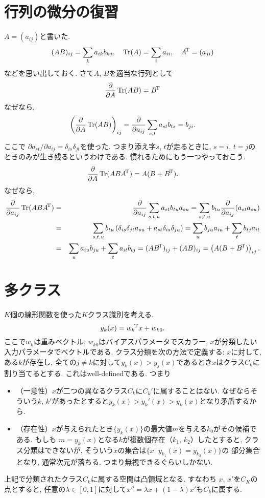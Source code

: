 \section{行列の微分の復習}
$A=(a_{ij})$と書いた.
$$
(AB)_{ij}=\sum_k a_{ik} b_{kj}, \quad \mathop{\mathrm{Tr}}\nolimits(A)=\sum_i a_{ii}, \quad {A}^{\!\mathrm{T}}=(a_{ji})
$$
などを思い出しておく.
さて$A$, $B$を適当な行列として
$$
\frac{\partial}{\partial A}\mathop{\mathrm{Tr}}\nolimits(AB)={B}^{\!\mathrm{T}}
$$
なぜなら,
$$
\left(\frac{\partial}{\partial A}\mathop{\mathrm{Tr}}\nolimits(AB)\right)_{ij}=\frac{\partial}{\partial a_{ij}}\sum_{s,t} a_{st} b_{ts} = b_{ji}.
$$
ここで
$\partial a_{st}/ \partial a_{ij}= \delta_{is} \delta_{jt}$を使った. つまり添え字$s$, $t$が走るときに, $s=i$, $t=j$のときのみが生き残るというわけである.
慣れるためにもう一つやっておこう.
$$
\frac{\partial}{\partial A}\mathop{\mathrm{Tr}}\nolimits(AB{A}^{\!\mathrm{T}})=A(B+{B}^{\!\mathrm{T}}).
$$
なぜなら,
\begin{eqnarray*}
\frac{\partial}{\partial a_{ij}} \mathop{\mathrm{Tr}}\nolimits(AB{A}^{\!\mathrm{T}})
 &=& \frac{\partial}{\partial a_{ij}} \sum_{s,t,u} a_{st} b_{tu} a_{su}
 = \sum_{s,t,u} b_{tu}  \frac{\partial}{\partial a_{ij}} (a_{st} a_{su})\\
 &=& \sum_{s,t,u} b_{tu} \left(\delta_{is} \delta_{jt} a_{su} + a_{st} \delta_{is} \delta_{ju}\right)
 = \sum_{u} b_{ju} a_{iu} + \sum_{t} b_{tj} a_{it}\\
 &=& \sum_{u} a_{iu} b_{ju} + \sum_{t} a_{it} b_{tj}
 = (A{B}^{\!\mathrm{T}})_{ij} + (AB)_{ij}
 = \left(A(B + {B}^{\!\mathrm{T}})\right)_{ij}.
\end{eqnarray*}
\vspace{0pt}

\section{多クラス}
$K$個の線形関数を使った$K$クラス識別を考える.
$$
y_k(x)={w_k}^{\!\mathrm{T}}x+w_{k0}.
$$
ここで$w_k$は重みベクトル, $w_{k0}$はバイアスパラメータでスカラー, $x$が分類したい入力パラメータでベクトルである.
クラス分類を次の方法で定義する:
$x$に対して, ある$k$が存在し, 全ての$j\neq k$に対して$y_k(x) > y_j(x)$であるとき$x$はクラス$C_k$に割り当てるとする.
これはwell-definedである.
つまり
\begin{itemize}
\item  （一意性）$x$が二つの異なるクラス$C_k$に$C_k'$に属することはない. なぜならそういう$k$, $k'$があったとすると$y_k(x) > y_k'(x) > y_k(x)$となり矛盾するから.
\item （存在性）$x$が与えられたとき$\{y_k(x)\}$の最大値$m$を与える$k_0$がその候補である. もしも
$m=y_k(x)$となる$k$が複数個存在（$k_1$, $k_2$）したとすると,
クラス分類はできないが, そういう$x$の集合は$\{x\,|\,y_{k_1}(x)=y_{k_2}(x)\}$の
部分集合となり, 通常次元が落ちる. つまり無視できるぐらいしかない.
\end{itemize}
上記で分類されたクラス$C_k$に属する空間は凸領域となる.
すなわち
$x$, $x'$を$C_K$の点とすると, 任意の$\lambda \in [0, 1]$に対して$x''=\lambda x + (1-\lambda) x'$も$C_k$に属する.

